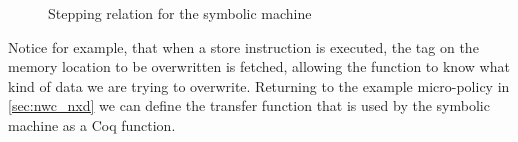\begin{figure}[htbp]
\bigskip

\bigskip

\bigskip

\bigskip


\caption{Stepping relation for the symbolic machine}
\label{symbolic_step}
\end{figure}

Notice for example, that when a store instruction is executed, the tag on
the memory location to be overwritten is fetched, allowing the
\TRANSFER function to know what kind of data we are trying to
overwrite. Returning to the example micro-policy in \ref{sec:nwc_nxd}
we can define the transfer function that is used by the symbolic machine
as a Coq function.

